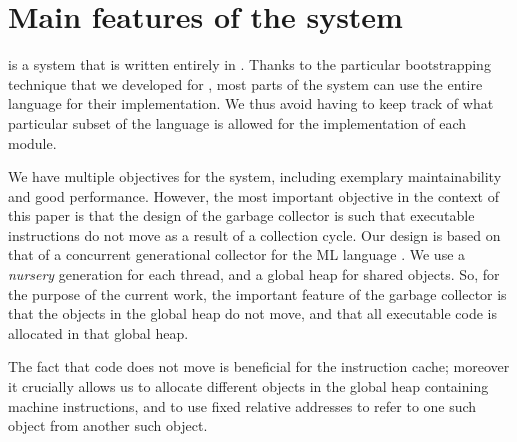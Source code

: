 \section{Main features of the \sicl{} system}
\label{sec-sicl-features}

\sicl{} is a system that is written entirely in \commonlisp{}.  Thanks
to the particular bootstrapping technique
\cite{durand_irene_2019_2634314} that we developed for \sicl{}, most
parts of the system can use the entire language for their
implementation.  We thus avoid having to keep track of what particular
subset of the language is allowed for the implementation of each
module.

We have multiple objectives for the \sicl{} system, including
exemplary maintainability and good performance.  However, the most
important objective in the context of this paper is that the design of
the garbage collector is such that executable instructions do not move
as a result of a collection cycle.  Our design is based on that of a
concurrent generational collector for the ML language
\cite{Doligez:1993:CGG}.  We use a \emph{nursery} generation for each
thread, and a global heap for shared objects.  So, for the purpose of
the current work, the important feature of the garbage collector is
that the objects in the global heap do not move, and that all
executable code is allocated in that global heap.

The fact that code does not move is beneficial for the instruction
cache; moreover it crucially allows us to allocate different objects
in the global heap containing machine instructions, and to use fixed
relative addresses to refer to one such object from another such
object.
